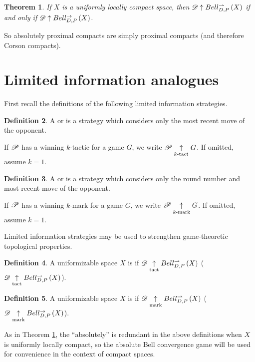 \documentclass{amsart}
\newtheorem{theorem}{Theorem}[section]
\theoremstyle{definition}
\newtheorem{definition}[theorem]{Definition}
\begin{document}
  \begin{theorem}\label{uniformlyLocallyCompact}
    If \(X\) is a uniformly locally compact space, then
    \(\mathscr{D} \uparrow Bell_{D,P}^{\rightharpoonup}\left({X}\right)\) if and only if
    \(\mathscr{D} \uparrow Bell_{D,P}^{\to}\left({X}\right)\).
  \end{theorem}

  So absolutely proximal compacts are simply proximal compacts (and therefore
  Corson compacts).


\section{Limited information analogues}

  First recall the definitions of the following limited information strategies.

  \begin{definition}
    A  or 
    is a strategy which considers only the most recent move of the opponent.

    If \(\mathscr{P}\) has a winning \(k\)-tactic for a game \(G\), we write
    \(\mathscr{P}\underset{k\text{-tact}}{\uparrow} G\). If omitted, assume \(k=1\).
  \end{definition}

  \begin{definition}
    A  or  is a strategy
    which considers only the round number and most recent move of the
    opponent.

    If \(\mathscr{P}\) has a winning \(k\)-mark for a game \(G\), we write
    \(\mathscr{P}\underset{k\text{-mark}}{\uparrow} G\). If omitted, assume \(k=1\).
  \end{definition}

  Limited information strategies may be used to strengthen game-theoretic
  topological properties.

  \begin{definition}
    A uniformizable space \(X\) is  if
    \(\mathscr{D} \underset{\text{tact}}{\uparrow} Bell_{D,P}^{\rightharpoonup}\left({X}\right)\) (\(\mathscr{D} \underset{\text{tact}}{\uparrow} Bell_{D,P}^{\to}\left({X}\right)\)).
  \end{definition}

  \begin{definition}
    A uniformizable space \(X\) is  if
    \(\mathscr{D} \underset{\text{mark}}{\uparrow} Bell_{D,P}^{\rightharpoonup}\left({X}\right)\) (\(\mathscr{D} \underset{\text{mark}}{\uparrow} Bell_{D,P}^{\to}\left({X}\right)\)).
  \end{definition}

  As in Theorem \ref{uniformlyLocallyCompact}, the ``absolutely''
  is redundant in the above definitions when \(X\) is uniformly locally compact,
  so the absolute Bell convergence game will be used for convenience in the
  context of compact spaces.
\end{document}
